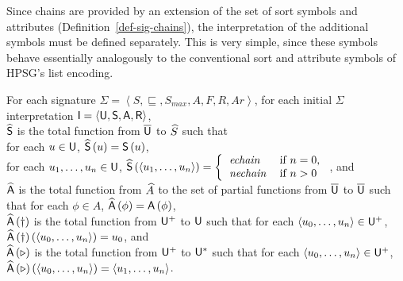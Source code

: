 \documentclass[output=paper,biblatex,babelshorthands,newtxmath,draftmode,colorlinks,citecolor=brown]{langscibook}
\begin{document}
{Since chains are provided by an extension of the set of sort symbols
and attributes (Definition~\ref{def-sig-chains}), the interpretation of the additional symbols must be
defined separately. This is very simple, since these
symbols behave essentially analogously to the conventional sort and attribute
symbols of HPSG's list encoding.

\begin{mydef}\label{def-expanded-interpretation}
  For each signature $\Sigma=\left<S,\sqsubseteq,S_{max},A,F,R,Ar\right>$,
  for each initial $\Sigma$ interpretation $\mathsf{I}=\langle\mathsf{U},\mathsf{S},\mathsf{A},\mathsf{R}\rangle$,\\
  $\widehat{\mathsf{S}}$ is the total function from $\overline{\mathsf{U}}$ to $\widehat{S}$
  such that\\
  \hspace*{.5cm} for each $u\in\mathsf{U}$, $\widehat{\mathsf{S}}\left(u\right)=\mathsf{S}\left(u\right)$,\\
  \hspace*{.5cm} for each $u_1, \ldots, u_n\in\Unive$,
            \(\Aug{\Speci}\left(\left<u_1,\ldots,u_n\right>\right)=\left\{
\begin{tabular}{ll}
$\mathit{echain}$
&
if $n = 0$,\\
$\mathit{nechain}$
&
if $n > 0$
\end{tabular}
\right.\), and\\
$\widehat{\mathsf{A}}$ is the total function from $\widehat{A}$ to the set of partial
functions from $\overline{\mathsf{U}}$ to $\overline{\mathsf{U}}$ such that
\hspace*{.5cm} for each $\phi\in A$, $\widehat{\mathsf{A}}\left(\phi\right)=\mathsf{A}\left(\phi\right)$,\\
\hspace*{.5cm} $\widehat{\mathsf{A}}\left(\dagger\right)$ is the total function from
$\mathsf{U}^{+}$ to $\mathsf{U}$ such that for each
$\left<u_0,\ldots,u_n\right>\in\Unive^{+}$,\\
\hspace*{1cm} $\Aug{\Atti}\left(\dagger\right)\left(\left<u_0,\ldots,u_n\right>\right)=u_0$, and\\
\hspace*{.5cm} $\widehat{\mathsf{A}}\left(\triangleright\right)$ is the total function from
$\mathsf{U}^{+}$ to $\mathsf{U}^{*}$ such that for each
$\left<u_0,\ldots,u_n\right>\in\Unive^{+}$,\\
\hspace*{1cm} $\Aug{\Atti}\left(\triangleright\right)\left(\left<u_0,\ldots,u_n\right>\right)=\left<u_1,\ldots,u_n\right>$.
\end{mydef}

}
\end{document}
